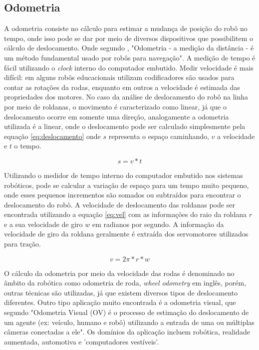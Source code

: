 \subsection{Odometria}\label{sec:odom}
A odometria consiste no cálculo para estimar a mudança de posição do robô no tempo, onde isso pode se dar por meio de diversos dispositivos que possibilitem o cálculo de deslocamento. Onde segundo \cite{ben2018robotic}, "Odometria - a medição da distância - é um método fundamental usado por robôs para navegação". A medição de tempo é fácil utilizando o \textit{clock} interno do computador embutido. Medir velocidade é mais difícil: em alguns robôs educacionais utilizam codificadores são usados para contar as rotações da rodas, enquanto em outros a velocidade é estimada das propriedades dos motores. 
No caso da análise de deslocamento do robô na linha por meio de roldanas, o movimento é caracterizado como linear, já que o deslocamento ocorre em somente uma direção, analogamente a odometria utilizada é a linear, onde o deslocamento pode ser calculado simplesmente pela equação \ref{eq:deslocamento} onde $s$ representa o espaço caminhando, $v$ a velocidade e $t$ o tempo. 

\begin{equation}\label{eq:deslocamento}
s = v*t
\end{equation}

Utilizando o medidor de tempo interno do computador embutido nos sistemas robóticos, pode se calcular a variação de espaço para um tempo muito pequeno, onde esses pequenos incrementos são somados ou subtraídos para encontrar o deslocamento do robô.
A velocidade de deslocamento das roldanas pode ser encontrada utilizando a equação \ref{eq:vel} com as informações do raio da roldana $r$ e a sua velocidade de giro $w$ em radianos por segundo. A informação da velocidade de giro da roldana geralmente é extraída dos servomotores utilizados para tração.

\begin{equation}\label{eq:vel}
v = 2\pi*r*w
\end{equation}

O cálculo da odometria por meio da velocidade das rodas é denominado no âmbito da robótica como odometria de roda, \textit{wheel odometry} em inglês, porém, outras técnicas são utilizadas, já que existem diversos tipos de deslocamento diferentes. Outro tipo aplicação muito encontrada é a odometria visual, que segundo \cite{nister2004visual} "Odometria Visual (OV) é o processo de estimação do deslocamento de um agente (ex: veículo, humano e robô) utilizando a entrada de uma ou múltiplas câmeras conectadas a ele". Os domínios da aplicação incluem robótica, realidade aumentada, automotiva e 'computadores vestíveis'.

